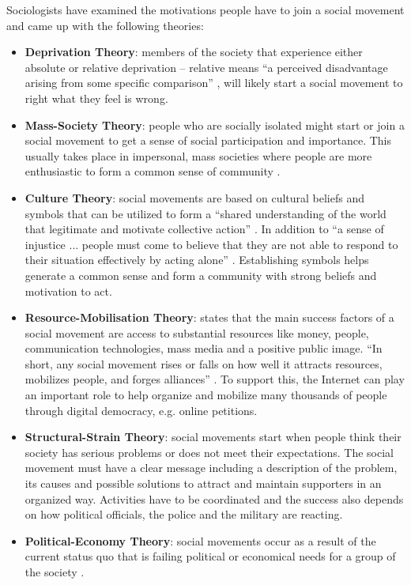 Sociologists have examined the motivations people have to join a social movement and came up with the following theories:
\begin{itemize}
	\item\textbf{Deprivation Theory}: members of the society that experience either absolute or relative deprivation -- relative means ``a perceived disadvantage arising from some specific comparison'' \citep[pg. 550]{Macionis12}, will likely start a social movement to right what they feel is wrong.
    \item\textbf{Mass-Society Theory}: people who are socially isolated might start or join a social movement to get a sense of social participation and importance. This usually takes place in impersonal, mass societies where people are more enthusiastic to form a common sense of community \citep[pg. 550f]{Macionis12}.
    \item\textbf{Culture Theory}: social movements are based on cultural beliefs and symbols that can be utilized to form a ``shared understanding of the world that legitimate and motivate collective action'' \citep[pg. 551]{Macionis12}. In addition to ``a sense of injustice ... people must come to believe that they are not able to respond to their situation effectively by acting alone'' \citep[pg. 551]{Macionis12}. Establishing symbols helps generate a common sense and form a community with strong beliefs and motivation to act. 
    \item\textbf{Resource-Mobilisation Theory}: states that the main success factors of a social movement are access to substantial resources like money, people, communication technologies, mass media and a positive public image. ``In short, any social movement rises or falls on how well it attracts resources, mobilizes people, and forges alliances'' \citep[pg. 552]{Macionis12}. To support this, the Internet can play an important role to help organize and mobilize many thousands of people through digital democracy, e.g. online petitions.
    \item\textbf{Structural-Strain Theory}: social movements start when people think their society has serious problems or does not meet their expectations. The social movement must have a clear message including a description of the problem, its causes and possible solutions to attract and maintain supporters in an organized way. Activities have to be coordinated and the success also depends on how political officials, the police and the military are reacting. \citep[pg. 553]{Macionis12}   
    \item\textbf{Political-Economy Theory}: social movements occur as a result of the current status quo that is failing political or economical needs for a group of the society  \citep[pg. 554]{Macionis12}.

\end{itemize}
